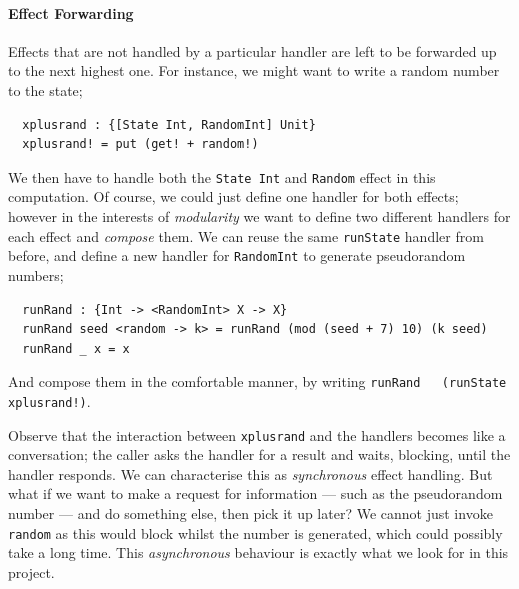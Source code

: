 \documentclass[msc,deptreport,cs]{infthesis} %
\newcommand{\code}[1]{\lstinline{#1}}
\begin{document}


\paragraph*{Effect Forwarding}

Effects that are not handled by a particular handler are left to be forwarded up
to the next highest one. For instance, we might want to write a random number to
the state;

\begin{lstlisting}
  xplusrand : {[State Int, RandomInt] Unit}
  xplusrand! = put (get! + random!)
\end{lstlisting}

\noindent We then have to handle both the \code{State Int} and \code{Random}
effect in this computation. Of course, we could just define one handler for both
effects; however in the interests of \emph{modularity} we want to define two
different handlers for each effect and \emph{compose} them. We can reuse the
same \code{runState} handler from before, and define a new handler for
\code{RandomInt} to generate pseudorandom numbers;

\begin{lstlisting}
  runRand : {Int -> <RandomInt> X -> X}
  runRand seed <random -> k> = runRand (mod (seed + 7) 10) (k seed)
  runRand _ x = x
\end{lstlisting}

\noindent And compose them in the comfortable manner, by writing \code{runRand
  (runState xplusrand!)}.

Observe that the interaction between \code{xplusrand} and the handlers becomes
like a conversation; the caller asks the handler for a result and waits,
blocking, until the handler responds. We can characterise this as
\emph{synchronous} effect handling. But what if we want to make a request for
information --- such as the pseudorandom number --- and do something else, then
pick it up later? We cannot just invoke \code{random} as this would block whilst
the number is generated, which could possibly take a long time. This
\emph{asynchronous} behaviour is exactly what we look for in this project.
\end{document}

